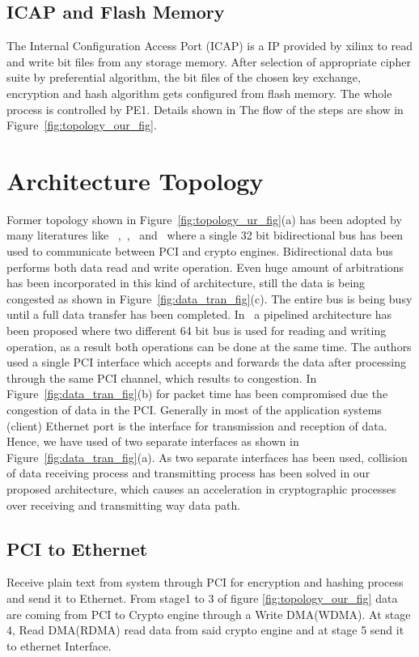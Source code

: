 \documentclass[3p,times]{elsarticle}
\begin{document}
\subsection{ICAP and Flash Memory}
The Internal Configuration Access Port (ICAP) is a IP provided by xilinx to read and write bit files from any storage memory. After selection of appropriate cipher suite by preferential algorithm, the bit files of the chosen key exchange, encryption and hash algorithm gets configured from flash memory. The whole process is controlled by PE1.
Details shown in \cite{xilinx:hwicap}
The flow of the steps are show in Figure~\ref{fig:topology_our_fig}.

\section{Architecture Topology}
Former topology shown in Figure~\ref{fig:topology_ur_fig}(a) has been adopted by many literatures like ~\cite{ieee:six},~\cite{motorola:ssl},~\cite{broadcom:ssl} and~\cite{hifn:ssl} where a single 32 bit bidirectional bus has been used to communicate between PCI and crypto engines. Bidirectional data bus performs both data read and write operation. Even huge amount of arbitrations has been incorporated  in this kind of architecture, still the data is being congested as shown in Figure~\ref{fig:data_tran_fig}(c). The entire bus is being busy until a full data transfer has been completed. In~\cite{ssl:gbps} a pipelined architecture has been proposed where two different 64 bit bus is used for reading and writing operation, as a result both operations can be done at the same time. The authors used a single PCI interface which accepts and forwards the data after processing through the same PCI channel, which results to congestion. In Figure~\ref{fig:data_tran_fig}(b) for  packet time  has been compromised due the congestion of data in the PCI. Generally in most of the application systems (client) Ethernet port is the interface for transmission and reception of data. Hence, we have used of two separate interfaces as shown in Figure~\ref{fig:data_tran_fig}(a). As two separate interfaces has been used, collision of data receiving process and transmitting process has been solved in our proposed architecture, which causes an acceleration in cryptographic processes over receiving and transmitting way data path.

\subsection{PCI to Ethernet}
Receive plain text from system through PCI for encryption and hashing process and send it to Ethernet. From stage1 to 3 of figure \ref{fig:topology_our_fig} data are coming from PCI to Crypto engine through a Write DMA(WDMA). At stage 4, Read DMA(RDMA) read data from said crypto engine and at stage 5 send it to ethernet Interface.
\end{document}
